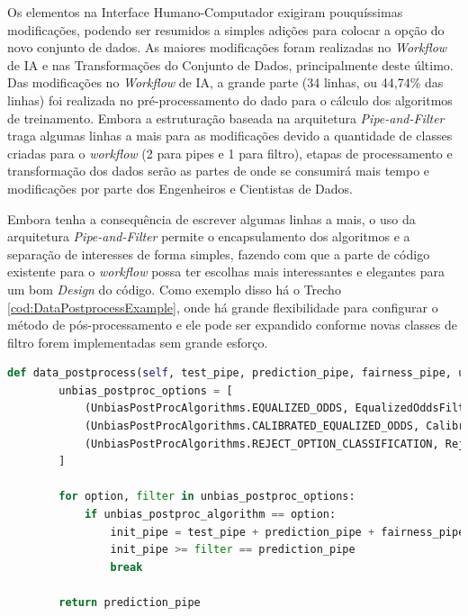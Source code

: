 \documentclass[portugues]{ic-tese}
\begin{document}
Os elementos na Interface Humano-Computador exigiram pouquíssimas modificações, podendo ser resumidos a simples adições para colocar a opção do novo conjunto de dados. As maiores modificações foram realizadas no \textit{Workflow} de IA e nas Transformações do Conjunto de Dados, principalmente deste último. Das modificações no \textit{Workflow} de IA, a grande parte (34 linhas, ou 44,74\% das linhas) foi realizada no pré-processamento do dado para o cálculo dos algoritmos de treinamento. Embora a estruturação baseada na arquitetura \textit{Pipe-and-Filter} traga algumas linhas a mais para as modificações devido a quantidade de classes criadas para o \textit{workflow} (2 para pipes e 1 para filtro), etapas de processamento e transformação dos dados serão as partes de onde se consumirá mais tempo e modificações por parte dos Engenheiros e Cientistas de Dados.

Embora tenha a consequência de escrever algumas linhas a mais, o uso da arquitetura \textit{Pipe-and-Filter} permite o encapsulamento dos algoritmos e a separação de interesses de forma simples, fazendo com que a parte de código existente para o \textit{workflow} possa ter escolhas mais interessantes e elegantes para um bom \textit{Design} do código. Como exemplo disso há o Trecho \ref{cod:DataPostprocessExample}, onde há grande flexibilidade para configurar o método de pós-processamento e ele pode ser expandido conforme novas classes de filtro forem implementadas sem grande esforço.

\begin{lstlisting}[language=Python, caption=Método para escolha do algoritmo com redução de viés no pós-processamento,label=cod:DataPostprocessExample]
    def data_postprocess(self, test_pipe, prediction_pipe, fairness_pipe, unbias_postproc_algorithm):
        unbias_postproc_options = [
            (UnbiasPostProcAlgorithms.EQUALIZED_ODDS, EqualizedOddsFilter()),
            (UnbiasPostProcAlgorithms.CALIBRATED_EQUALIZED_ODDS, CalibratedEqualizedOddsFilter()),
            (UnbiasPostProcAlgorithms.REJECT_OPTION_CLASSIFICATION, RejectOptionClassificationFilter())
        ]

        for option, filter in unbias_postproc_options:
            if unbias_postproc_algorithm == option:
                init_pipe = test_pipe + prediction_pipe + fairness_pipe['unprivileged_group', 'privileged_group']
                init_pipe >= filter == prediction_pipe
                break

        return prediction_pipe
\end{lstlisting}
\end{document}
